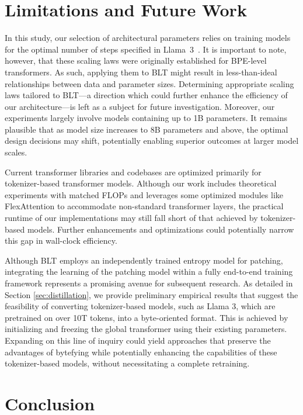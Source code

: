 \section{Limitations and Future Work}

In this study, our selection of architectural parameters relies on training models for the optimal number of steps specified in Llama~3~\citep{dubey2024llama}. It is important to note, however, that these scaling laws were originally established for BPE-level transformers. As such, applying them to {\textsc BLT} might result in less-than-ideal relationships between data and parameter sizes. Determining appropriate scaling laws tailored to {\textsc BLT}—a direction which could further enhance the efficiency of our architecture—is left as a subject for future investigation. Moreover, our experiments largely involve models containing up to 1B parameters. It remains plausible that as model size increases to 8B parameters and above, the optimal design decisions may shift, potentially enabling superior outcomes at larger model scales.

Current transformer libraries and codebases are optimized primarily for tokenizer-based transformer models. Although our work includes theoretical experiments with matched FLOPs and leverages some optimized modules like FlexAttention to accommodate non-standard transformer layers, the practical runtime of our implementations may still fall short of that achieved by tokenizer-based models. Further enhancements and optimizations could potentially narrow this gap in wall-clock efficiency.

Although {\textsc BLT} employs an independently trained entropy model for patching, integrating the learning of the patching model within a fully end-to-end training framework represents a promising avenue for subsequent research. As detailed in Section \ref{sec:distillation}, we provide preliminary empirical results that suggest the feasibility of converting tokenizer-based models, such as Llama 3, which are pretrained on over 10T tokens, into a byte-oriented format. This is achieved by initializing and freezing the global transformer using their existing parameters. Expanding on this line of inquiry could yield approaches that preserve the advantages of bytefying while potentially enhancing the capabilities of these tokenizer-based models, without necessitating a complete retraining.

\section{Conclusion}
\label{section:conclusion}

